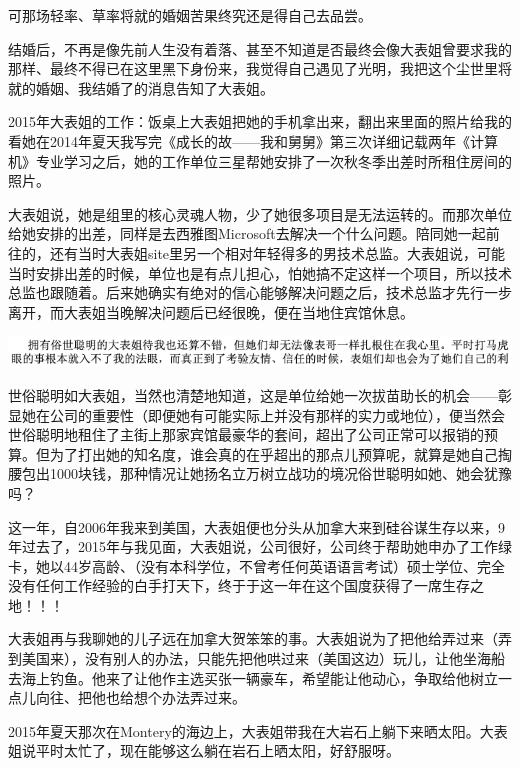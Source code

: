 \documentclass[9pt, b5paper]{article}
\begin{document}
可那场轻率、草率将就的婚姻苦果终究还是得自己去品尝。

结婚后，不再是像先前人生没有着落、甚至不知道是否最终会像大表姐曾要求我的那样、最终不得已在这里黑下身份来，我觉得自己遇见了光明，我把这个尘世里将就的婚姻、我结婚了的消息告知了大表姐。

2015年大表姐的工作：饭桌上大表姐把她的手机拿出来，翻出来里面的照片给我的看她在2014年夏天我写完《成长的故——我和舅舅》第三次详细记载两年《计算机》专业学习之后，她的工作单位三星帮她安排了一次秋冬季出差时所租住房间的照片。

大表姐说，她是组里的核心灵魂人物，少了她很多项目是无法运转的。而那次单位给她安排的出差，同样是去西雅图Microsoft去解决一个什么问题。陪同她一起前往的，还有当时大表姐site里另一个相对年轻得多的男技术总监。大表姐说，可能当时安排出差的时候，单位也是有点儿担心，怕她搞不定这样一个项目，所以技术总监也跟随着。后来她确实有绝对的信心能够解决问题之后，技术总监才先行一步离开，而大表姐当晚解决问题后已经很晚，便在当地住宾馆休息。

\begin{center}
\includegraphics[width=.9\linewidth]{./pic/backups_plans_20210427_184530.png}
\end{center}

世俗聪明如大表姐，当然也清楚地知道，这是单位给她一次拔苗助长的机会——彰显她在公司的重要性（即便她有可能实际上并没有那样的实力或地位），便当然会世俗聪明地租住了主街上那家宾馆最豪华的套间，超出了公司正常可以报销的预算。但为了打出她的知名度，谁会真的在乎超出的那点儿预算呢，就算是她自己掏腰包出1000块钱，那种情况让她扬名立万树立战功的境况俗世聪明如她、她会犹豫吗？

这一年，自2006年我来到美国，大表姐便也分头从加拿大来到硅谷谋生存以来，9年过去了，2015年与我见面，大表姐说，公司很好，公司终于帮助她申办了工作绿卡，她以44岁高龄、（没有本科学位，不曾考任何英语语言考试）硕士学位、完全没有任何工作经验的白手打天下，终于于这一年在这个国度获得了一席生存之地！！！

大表姐再与我聊她的儿子远在加拿大贺笨笨的事。大表姐说为了把他给弄过来（弄到美国来），没有别人的办法，只能先把他哄过来（美国这边）玩儿，让他坐海船去海上钓鱼。他来了让他作主选买张一辆豪车，希望能让他动心，争取给他树立一点儿向往、把他也给想个办法弄过来。 

2015年夏天那次在Montery的海边上，大表姐带我在大岩石上躺下来晒太阳。大表姐说平时太忙了，现在能够这么躺在岩石上晒太阳，好舒服呀。
\end{document}
